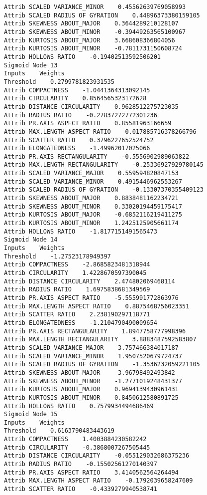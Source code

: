 \documentclass[
	article,			%
	11pt,				%
	oneside,			%
	a4paper,			%
	english,			%
	brazil,				%
	sumario=tradicional
	]{abntex2}
\begin{document}
\begin{lstlisting}
Attrib SCALED VARIANCE_MINOR    0.45562639769058993
Attrib SCALED RADIUS OF GYRATION    0.44896373380159105
Attrib SKEWNESS ABOUT_MAJOR    0.3644289210128107
Attrib SKEWNESS ABOUT_MINOR    -0.39449263565100967
Attrib KURTOSIS ABOUT_MAJOR    3.668608366804056
Attrib KURTOSIS ABOUT_MINOR    -0.7811731150608724
Attrib HOLLOWS RATIO    -0.19402513592506201
Sigmoid Node 13
Inputs    Weights
Threshold    0.2799781823931535
Attrib COMPACTNESS    -1.0441364313092145
Attrib CIRCULARITY    0.8564565323172628
Attrib DISTANCE CIRCULARITY    0.9628512275723035
Attrib RADIUS RATIO    -0.27837272772301236
Attrib PR.AXIS ASPECT RATIO    0.85581963166659
Attrib MAX.LENGTH ASPECT RATIO    0.017885716378266796
Attrib SCATTER RATIO    0.3796227652524752
Attrib ELONGATEDNESS    -1.49962017025066
Attrib PR.AXIS RECTANGULARITY    -0.5556902989063822
Attrib MAX.LENGTH RECTANGULARITY    -0.25336927929780145
Attrib SCALED VARIANCE_MAJOR    0.559594820847153
Attrib SCALED VARIANCE_MINOR    0.4915446962553267
Attrib SCALED RADIUS OF GYRATION    -0.13307370355409123
Attrib SKEWNESS ABOUT_MAJOR    0.8838481162234721
Attrib SKEWNESS ABOUT_MINOR    0.33020194459175417
Attrib KURTOSIS ABOUT_MAJOR    -0.6852116219411275
Attrib KURTOSIS ABOUT_MINOR    1.2425125905661174
Attrib HOLLOWS RATIO    -1.8177151491565473
Sigmoid Node 14
Inputs    Weights
Threshold    -1.27523178949397
Attrib COMPACTNESS    -2.8685823481318944
Attrib CIRCULARITY    1.4228670597390045
Attrib DISTANCE CIRCULARITY    2.474802069468114
Attrib RADIUS RATIO    1.6975838681349569
Attrib PR.AXIS ASPECT RATIO    -5.555991772863976
Attrib MAX.LENGTH ASPECT RATIO    0.8875468756023351
Attrib SCATTER RATIO    2.238190297118771
Attrib ELONGATEDNESS    -1.2104790490009654
Attrib PR.AXIS RECTANGULARITY    1.8947758777998396
Attrib MAX.LENGTH RECTANGULARITY    3.8883487592583807
Attrib SCALED VARIANCE_MAJOR    3.757466384017187
Attrib SCALED VARIANCE_MINOR    1.9507520679724737
Attrib SCALED RADIUS OF GYRATION    -1.3536232059221105
Attrib SKEWNESS ABOUT_MAJOR    -3.96798492493842
Attrib SKEWNESS ABOUT_MINOR    -1.2771019248431377
Attrib KURTOSIS ABOUT_MAJOR    0.9694139430961431
Attrib KURTOSIS ABOUT_MINOR    0.8450612580891725
Attrib HOLLOWS RATIO    0.7579934494686469
Sigmoid Node 15
Inputs    Weights
Threshold    0.6163790483443619
Attrib COMPACTNESS    1.4003884230582242
Attrib CIRCULARITY    -0.3868007267505445
Attrib DISTANCE CIRCULARITY    -0.055129032686375236
Attrib RADIUS RATIO    -0.15502561270140397
Attrib PR.AXIS ASPECT RATIO    3.4140562564264494
Attrib MAX.LENGTH ASPECT RATIO    -0.1792039658247609
Attrib SCATTER RATIO    -0.4339279940538741

\end{lstlisting}
\end{document}
